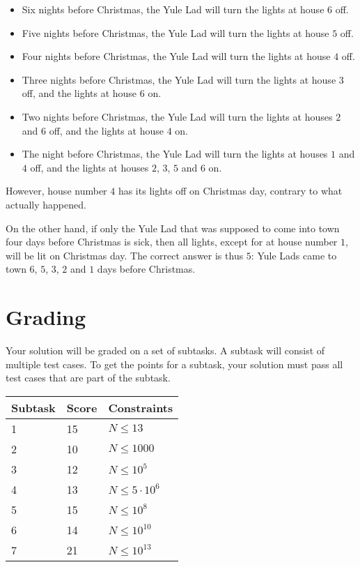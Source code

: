 \begin{itemize}
    \item Six nights before Christmas, the Yule Lad will turn the lights at house $6$ off.
    \item Five nights before Christmas, the Yule Lad will turn the lights at house $5$ off.
    \item Four nights before Christmas, the Yule Lad will turn the lights at house $4$ off.
    \item Three nights before Christmas, the Yule Lad will turn the lights at house $3$ off, and the lights at house $6$ on.
    \item Two nights before Christmas, the Yule Lad will turn the lights at houses $2$ and $6$ off, and the lights at house $4$ on.
    \item The night before Christmas, the Yule Lad will turn the lights at houses $1$ and $4$ off, and the lights at houses $2$, $3$, $5$ and $6$ on.
\end{itemize}

However, house number $4$ has its lights off on Christmas day, contrary to what
actually happened.

On the other hand, if only the Yule Lad that was supposed to come into town
four days before Christmas is sick, then all lights, except for at house number
$1$, will be lit on Christmas day. The correct answer is thus $5$: Yule Lads
came to town $6$, $5$, $3$, $2$ and $1$ days before Christmas.

\section*{Grading}
Your solution will be graded on a set of subtasks.
A subtask will consist of multiple test cases.
To get the points for a subtask, your solution must pass all test cases that are part of the subtask.

\noindent
\begin{tabular}{| l | l | l |}
\hline
Subtask & Score & Constraints \\ \hline
1 & 15 & $N \leq 13$ \\ \hline
2 & 10 & $N \leq 1000$ \\ \hline
3 & 12 & $N \leq 10^5$ \\ \hline
4 & 13 & $N \leq 5 \cdot 10^{6}$ \\ \hline
5 & 15 & $N \leq 10^{8}$ \\ \hline
6 & 14 & $N \leq 10^{10}$ \\ \hline
7 & 21 & $N \leq 10^{13}$ \\ \hline
\end{tabular}

